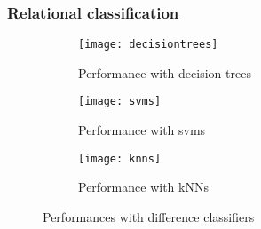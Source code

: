 \subsubsection{Relational classification}


\begin{figure}[!htb]
	\centering
	\begin{subfigure}{0.98\linewidth}
		\centering
		\texttt{[image: decisiontrees]}
		\caption{Performance with decision trees\label{fig:dtres}}
	\end{subfigure}
	
	\begin{subfigure}{0.98\linewidth}
		\centering
		\texttt{[image: svms]}
		
		\caption{Performance with svms\label{fig:svms}}
	\end{subfigure}
	
	\begin{subfigure}{0.98\linewidth}
		\centering
		\texttt{[image: knns]}
		
		\caption{Performance with kNNs\label{fig:knns}}
	\end{subfigure}
	
	\caption{Performances with difference classifiers}
\end{figure}





